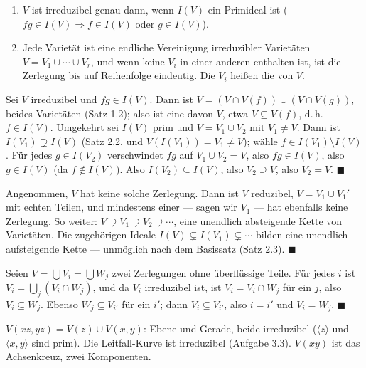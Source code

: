 \begin{merksatz}
\begin{enumerate}[label=(\alph*), leftmargin=1.6em]
\item $V$ ist irreduzibel genau dann, wenn $I(V)$ ein Primideal ist ($fg\in I(V)\Rightarrow f\in I(V)$ oder $g\in I(V)$).
\item Jede Varietät ist eine endliche Vereinigung irreduzibler Varietäten $V = V_1\cup\cdots\cup V_r$, und wenn keine $V_i$ in einer anderen enthalten ist, ist die Zerlegung bis auf Reihenfolge eindeutig. Die $V_i$ heißen die  von $V$.
\end{enumerate}

Sei $V$ irreduzibel und $fg\in I(V)$. Dann ist $V = (V\cap V(f))\cup(V\cap V(g))$, beides Varietäten (Satz 1.2); also ist eine davon $V$, etwa $V\subseteq V(f)$, d.\,h.\ $f\in I(V)$. Umgekehrt sei $I(V)$ prim und $V = V_1\cup V_2$ mit $V_1\ne V$. Dann ist $I(V_1)\supsetneq I(V)$ (Satz 2.2, und $V(I(V_1)) = V_1\ne V$); wähle $f\in I(V_1)\setminus I(V)$. Für jedes $g\in I(V_2)$ verschwindet $fg$ auf $V_1\cup V_2 = V$, also $fg\in I(V)$, also $g\in I(V)$ (da $f\notin I(V)$). Also $I(V_2)\subseteq I(V)$, also $V_2\supseteq V$, also $V_2 = V$. $\blacksquare$

Angenommen, $V$ hat keine solche Zerlegung. Dann ist $V$ reduzibel, $V = V_1\cup V_1'$ mit echten Teilen, und mindestens einer --- sagen wir $V_1$ --- hat ebenfalls keine Zerlegung. So weiter: $V\supsetneq V_1\supsetneq V_2\supsetneq\cdots$, eine unendlich absteigende Kette von Varietäten. Die zugehörigen Ideale $I(V)\subsetneq I(V_1)\subsetneq\cdots$ bilden eine unendlich aufsteigende Kette --- unmöglich nach dem Basissatz (Satz 2.3). $\blacksquare$

Seien $V = \bigcup V_i = \bigcup W_j$ zwei Zerlegungen ohne überflüssige Teile. Für jedes $i$ ist $V_i = \bigcup_j(V_i\cap W_j)$, und da $V_i$ irreduzibel ist, ist $V_i = V_i\cap W_{j}$ für ein $j$, also $V_i\subseteq W_j$. Ebenso $W_j\subseteq V_{i'}$ für ein $i'$; dann $V_i\subseteq V_{i'}$, also $i = i'$ und $V_i = W_j$. $\blacksquare$

$V(xz, yz) = V(z)\cup V(x, y)$: Ebene und Gerade, beide irreduzibel ($\langle z\rangle$ und $\langle x, y\rangle$ sind prim). Die Leitfall-Kurve ist irreduzibel (Aufgabe 3.3). $V(xy)$ ist das Achsenkreuz, zwei Komponenten.


\end{merksatz}

